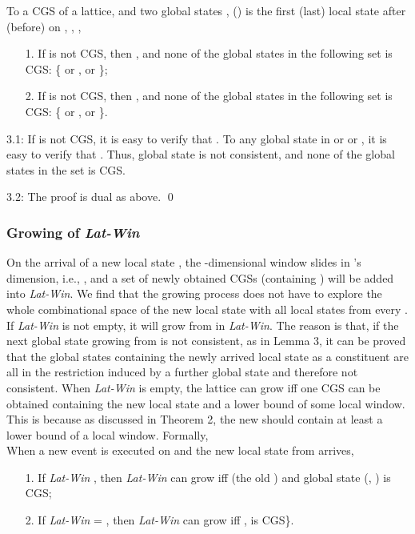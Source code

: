 \documentclass[12pt,journal,letterpaper,compsoc]{IEEEtran}
\begin{document}
 To a CGS  of a lattice, and two global states ,  () is the first (last) local state after (before)  on , , ,
\begin{itemize}
    \item[1.] If  is not CGS, then , and none of the global states in the following set is CGS:
        \{  or ,  or \};
    \item[2.] If  is not CGS, then , and none of the global states in the following set is CGS:
        \{  or ,  or \}.
\end{itemize}


3.1: If  is not CGS, it is easy to verify that . To any global state  in  or  or , it is easy to verify that . Thus, global state  is not consistent, and none of the global states in the set is CGS.

3.2: The proof is dual as above. \qed\\

\subsubsection{Growing of {\it Lat-Win}}

On the arrival of a new local state , the -dimensional window slides in 's dimension, i.e., , and a set of newly obtained CGSs (containing ) will be added into {\it Lat-Win}. We find that the growing process does not have to explore the whole combinational space of the new local state with all local states from every . If {\it Lat-Win} is not empty, it will grow from  in {\it Lat-Win}. The reason is that, if the next global state growing from  is not consistent, as  in Lemma 3, it can be proved that the global states containing the newly arrived local state as a constituent are all in the restriction induced by a further global state and therefore not consistent. When {\it Lat-Win} is empty, the lattice can grow iff one CGS can be obtained containing the new local state and a lower bound of some local window. This is because as discussed in Theorem 2, the new  should contain at least a lower bound of a local window. Formally, \\

 When a new event  is executed on  and the new local state  from  arrives,
\begin{itemize}
    \item[1.] If {\it Lat-Win} , then {\it Lat-Win} can grow iff  (the old ) and global state  (, ) is CGS;
    \item[2.] If {\it Lat-Win} = , then {\it Lat-Win} can grow iff ,  is CGS\}.
\end{itemize}
\end{document}
